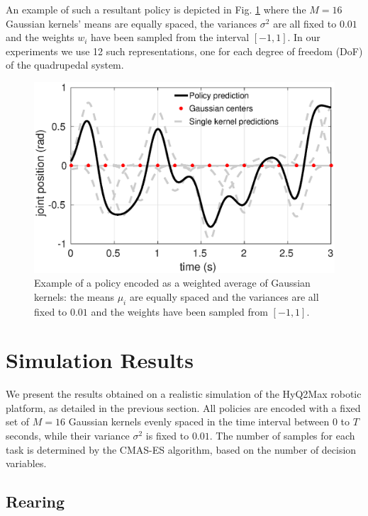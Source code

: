\documentclass[usletter, 10pt, conference]{ieeeconf}      %
\begin{document}
An example of such a resultant policy is depicted in Fig. \ref{fig:policy_example} where the $M=16$ Gaussian kernels'
means are equally spaced, the variances $\sigma^2$ are all fixed to $0.01$ and 
the weights $w_i$ have been sampled from the interval $[-1,1]$. In our experiments we use 12 such representations, one for each degree
of freedom (DoF) of the quadrupedal system.

\begin{figure}[t!]
 \centering
 \includegraphics[scale=.4]{example_gr3.eps} 
 \caption{Example of a policy encoded as a weighted average of 
 Gaussian kernels: the means $\mu_i$ are equally spaced and the 
 variances are all fixed to $0.01$ and the weights have been 
 sampled from $[-1,1]$.}
 \vspace*{-5mm}
  \label{fig:policy_example}
\end{figure}


\section{Simulation Results}

We present the results obtained on a realistic simulation of the 
HyQ2Max robotic platform, as detailed in the previous section. All policies are 
encoded with a fixed set of $M=16$ Gaussian kernels evenly spaced in the time interval
between $0$ to $T$ seconds, while their variance $\sigma^2$ is fixed to $0.01$. 
The number of samples for each task is determined by the CMAS-ES algorithm,
based on the number of decision variables.

\subsection{Rearing}
\end{document}
